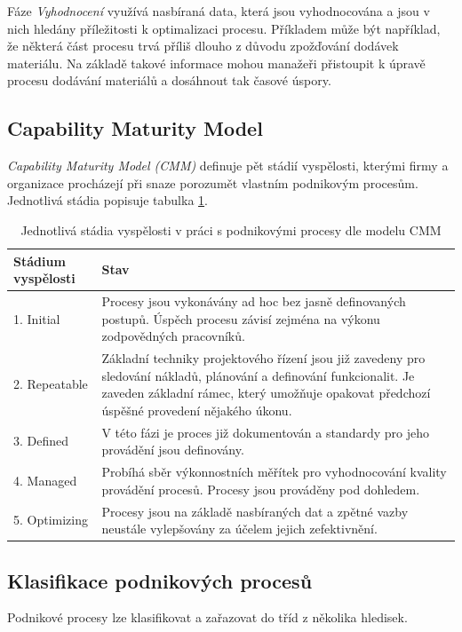 Fáze \textit{Vyhodnocení} využívá nasbíraná data, která jsou vyhodnocována a jsou v nich hledány příležitosti k optimalizaci procesu. Příkladem může být například, že některá část procesu trvá příliš dlouho z důvodu zpožďování dodávek materiálu. Na základě takové informace mohou manažeři přistoupit k úpravě procesu dodávání materiálů a dosáhnout tak časové úspory.

\subsection{Capability Maturity Model}
\textit{Capability Maturity Model (CMM)} definuje pět stádií vyspělosti, kterými firmy a organizace procházejí při snaze porozumět vlastním podnikovým procesům. Jednotlivá stádia popisuje tabulka \ref{tab:cmm}.


\begin{table}[H]\centering
  \begin{tabular}{ | l | p{10cm} | }
    \hline
    \textbf{Stádium vyspělosti} & \textbf{Stav} \\ \hline\hline
    1. Initial & Procesy jsou vykonávány ad hoc bez jasně definovaných postupů. \newline Úspěch procesu závisí zejména na výkonu zodpovědných pracovníků. \\ \hline
    2. Repeatable & Základní techniky projektového řízení jsou již zavedeny pro sledování nákladů, plánování a definování funkcionalit. Je zaveden základní rámec, který umožňuje opakovat předchozí úspěšné provedení nějakého úkonu.  \\ \hline
    3. Defined & V této fázi je proces již dokumentován a standardy pro jeho provádění jsou definovány. \\ \hline
    4. Managed & Probíhá sběr výkonnostních měřítek pro vyhodnocování kvality provádění procesů. Procesy jsou prováděny pod dohledem.  \\ \hline
    5. Optimizing & Procesy jsou na základě nasbíraných dat a zpětné vazby neustále vylepšovány za účelem jejich zefektivnění.  \\
    \hline
  \end{tabular}
  \caption{Jednotlivá stádia vyspělosti v práci s podnikovými procesy dle modelu CMM \cite{Harmon2014}}
  \label{tab:cmm}
\end{table}

\subsection{Klasifikace podnikových procesů}
Podnikové procesy lze klasifikovat a zařazovat do tříd z několika hledisek. 

